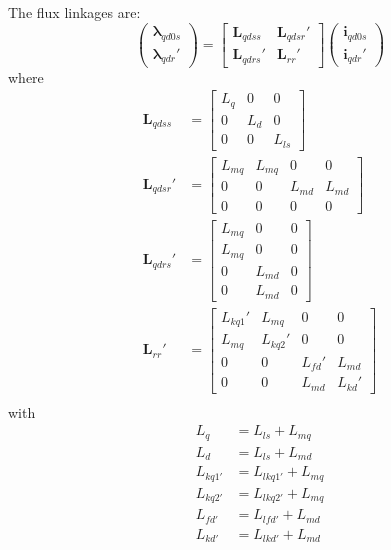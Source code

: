 %
The flux linkages are:
%
\begin{equation}
  \begin{pmatrix}
    \boldsymbol{\lambda}_{qd0s} \\
    \boldsymbol{\lambda}_{qdr}'
  \end{pmatrix}
  =
  \begin{bmatrix}
    \mathbf{L}_{qdss} & \mathbf{L}_{qdsr}' \\
    \mathbf{L}_{qdrs}' & \mathbf{L}_{rr}'    
  \end{bmatrix}
  \begin{pmatrix}
    \mathbf{i}_{qd0s} \\
    \mathbf{i}_{qdr}'
  \end{pmatrix}
  \label{eq:flux}
\end{equation}
%
where
%
\begin{align}
  \mathbf{L}_{qdss} &= 
  \begin{bmatrix}
    L_{q} & 0 & 0 \\
    0 & L_{d} & 0 \\
    0 & 0 & L_{ls}
  \end{bmatrix} \\
  \mathbf{L}_{qdsr}' &= 
  \begin{bmatrix}
    L_{mq} & L_{mq} & 0 & 0 \\
    0 & 0 & L_{md} & L_{md} \\
    0 & 0 & 0 & 0
  \end{bmatrix} \\
  \mathbf{L}_{qdrs}' &=
  \begin{bmatrix}
    L_{mq} & 0 & 0 \\
    L_{mq} & 0 & 0 \\
    0 & L_{md} & 0 \\
    0 & L_{md} & 0
  \end{bmatrix} \\
  \mathbf{L}_{rr}' &=
  \begin{bmatrix}
    L_{kq1}' & L_{mq} & 0 & 0 \\
    L_{mq} & L_{kq2}' & 0 & 0 \\
    0 & 0 & L_{fd}' & L_{md} \\
    0 & 0 & L_{md} & L_{kd}'
  \end{bmatrix} \\
\end{align}
%
with 
%
\begin{align}
  L_{q} &= L_{ls} + L_{mq} \\
  L_{d} &= L_{ls} + L_{md} \\
  L_{kq1'} &= L_{lkq1'} + L_{mq} \\
  L_{kq2'} &= L_{lkq2'} + L_{mq} \\
  L_{fd'} &= L_{lfd'} + L_{md} \\
  L_{kd'} &= L_{lkd'} + L_{md}
\end{align}

